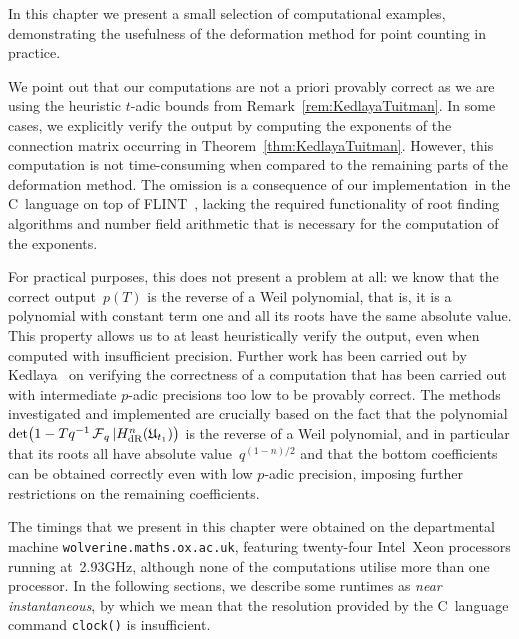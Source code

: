 
In this chapter we present a small selection of computational examples, 
demonstrating the usefulness of the deformation method for point counting 
in practice.

We point out that our computations are not a priori provably 
correct as we are using the heuristic $t$-adic bounds from 
Remark~\ref{rem:KedlayaTuitman}.  In some cases, we explicitly 
verify the output by computing the exponents of the connection 
matrix occurring in Theorem~\ref{thm:KedlayaTuitman}.  However, 
this computation is not time-consuming when compared to the 
remaining parts of the deformation method.  The omission is 
a consequence of our implementation\footnotemark\ in the C~language 
on top of FLINT~\citep{FLINT}, lacking the required functionality 
of root finding algorithms and number field arithmetic that is 
necessary for the computation of the exponents.  


For practical purposes, this does not present a problem at all:  we know 
that the correct output~$p(T)$ is the reverse of a Weil polynomial, that 
is, it is a polynomial with constant term one and all its roots have 
the same absolute value.  This property allows us to at least 
heuristically verify the output, even when computed with insufficient 
precision.  Further work has been carried out by Kedlaya~\citep{Kedlaya2008} 
on verifying the correctness of a computation that has been carried out 
with intermediate $p$-adic precisions too low to be provably correct. 
The methods investigated and implemented are crucially based on the 
fact that the polynomial 
\mbox{$\det\bigl(1 - T q^{-1} \operatorname{\mathcal{F}}_q | H_{\text{dR}}^{n}(\mathfrak{U}_{t_1})\bigr)$} 
is the reverse of a Weil polynomial, and in particular that its 
roots all have absolute value~$q^{(1-n)/2}$ and that the bottom 
coefficients can be obtained correctly even with low $p$-adic precision, 
imposing further restrictions on the remaining coefficients.

The timings that we present in this chapter were obtained on the 
departmental machine {\tt{wolverine.maths.ox.ac.uk}}, featuring twenty-four 
\mbox{Intel Xeon} processors running at~2.93GHz, although none of the 
computations utilise more than one processor.  In the following sections, 
we describe some runtimes as \emph{near instantaneous}, by which we mean 
that the resolution provided by the C~language command {\tt{clock()}} is 
insufficient.

